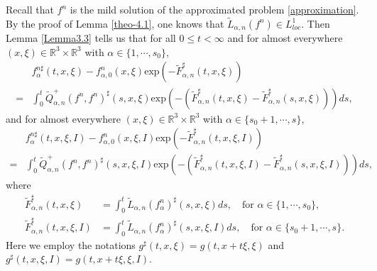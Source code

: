 \documentclass[reqno,11pt]{amsart}
\numberwithin{equation}{section}
\def\R{\mathbb{R}}
\def\exp{\mathrm{exp}}
\begin{document}
Recall that $f^n$ is the mild solution of the approximated problem \eqref{approximation}. By the proof of Lemma \ref{theo-4.1}, one knows that $ \tilde{L}_{\alpha, n} (f^n) \in L^1_{loc} $. Then Lemma \ref{Lemma3.3} tells us that for all $0\leq t <\infty $ and for almost everywhere $(x,\xi)\in \R^3 \times \R^3 $ with $\alpha \in \{1,\cdots,s_0\}$, 
\begin{equation}\label{eq up3}
	\begin{aligned}
		&f^{n\sharp}_\alpha (t,x,\xi) -f^n_{\alpha ,0} (x,\xi )\exp(-\tilde{F}^\sharp _{\alpha ,n } (t,x,\xi ))\\
		=&\int_{0}^{t}\tilde{Q}^+_{\alpha ,n} (f^n,f^n)^\sharp (s ,x,\xi ) \exp(-(\tilde{F}^\sharp _{\alpha ,n} (t,x,\xi )-\tilde{F}^\sharp _{\alpha ,n} (s,x,\xi ))) ds,
	\end{aligned}
\end{equation}
and for almost everywhere $(x,\xi)\in \R^3 \times \R^3 $ with $\alpha \in \{s_0+1,\cdots,s\}$, 
\begin{equation}\label{eq up4}
	\begin{aligned}
		&f^{n\sharp}_\alpha (t,x,\xi ,I) -f^n_{\alpha ,0} (x,\xi ,I )\exp(-\tilde{F}^\sharp _{\alpha ,n } (t,x,\xi ,I))\\
		=&\int_{0}^{t}\tilde{Q}^+_{\alpha ,n} (f^n,f^n)^\sharp (s ,x,\xi ,I) \exp(-(\tilde{F}^\sharp _{\alpha ,n} (t,x,\xi ,I )-\tilde{F}^\sharp _{\alpha ,n} (s,x,\xi ,I))) ds,
	\end{aligned}
\end{equation}
where
\begin{equation*}
	\begin{aligned}
		\tilde{F}^\sharp _{\alpha ,n} (t,x,\xi ) &= \int_{0}^{t} \tilde{L}_{\alpha ,n} (f^n_\alpha )^\sharp (s,x,\xi ) ds, \quad \text{for } \alpha \in \{1,\cdots,s_0\}, \\
		\tilde{F}^\sharp _{\alpha ,n} (t,x,\xi ,I) &= \int_{0}^{t} \tilde{L}_{\alpha ,n} (f^n_\alpha )^\sharp (s,x,\xi ,I) ds, \quad \text{for } \alpha \in \{s_0+1,\cdots,s\}.
	\end{aligned}
\end{equation*}
Here we employ the notations $g^\sharp (t, x, \xi) = g (t, x + t \xi, \xi)$ and $g^\sharp (t, x, \xi, I) = g (t, x + t \xi, \xi, I)$.
\end{document}
